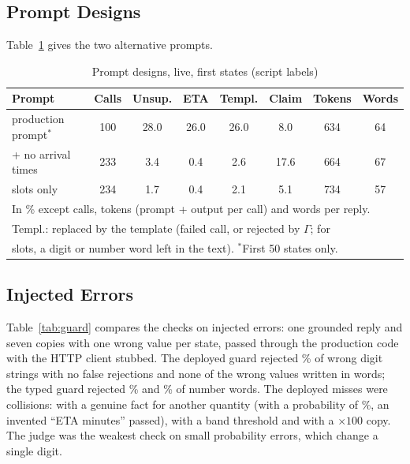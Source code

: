 \documentclass[conference]{IEEEtran}
\begin{document}
\subsection{Prompt Designs}
\label{sec:design}
Table~\ref{tab:design} gives the two alternative prompts. \DesignText{}

\begin{table}[t]
\caption{Prompt designs, live, first \VarStates{} states (script labels)}
\label{tab:design}
\centering
\footnotesize
\setlength{\tabcolsep}{2.2pt}
\begin{tabular}{lccccccc}
\toprule
Prompt & Calls & Unsup. & ETA & Templ. & Claim & Tokens & Words\\
\midrule
production prompt$^\ast$ & 100 & 28.0 & 26.0 & 26.0 & 8.0 & 634 & 64\\
+ no arrival times & 233 & 3.4 & 0.4 & 2.6 & 17.6 & 664 & 67\\
slots only & 234 & 1.7 & 0.4 & 2.1 & 5.1 & 734 & 57\\
\bottomrule
\multicolumn{8}{l}{\scriptsize In \% except calls, tokens (prompt + output per call) and words per reply.}\\
\multicolumn{8}{l}{\scriptsize Templ.: replaced by the template (failed call, or rejected by $\Gamma$; for}\\
\multicolumn{8}{l}{\scriptsize slots, a digit or number word left in the text). $^\ast$First 50 states only.}\\
\end{tabular}
\end{table}

\subsection{Injected Errors}
Table~\ref{tab:guard} compares the checks on injected errors: one grounded reply and seven copies with one wrong value per state, passed through the production code with the HTTP client stubbed. The deployed guard rejected \GAllDeployed\% of wrong digit strings with no false rejections and none of the wrong values written in words; the typed guard rejected \GAllTyped\% and \GWordsTyped\% of number words. The \GMissN{} deployed misses were collisions: \GMissFact{} with a genuine fact for another quantity (with a probability of \MissExProb\%, an invented ``ETA \MissExEta{} minutes'' passed), \GMissRule{} with a band threshold and \GMissScale{} with a $\times100$ copy. The judge was the weakest check on small probability errors, which change a single digit.
\end{document}
